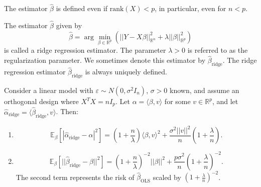 \documentclass[open=any, 11pt,paper=A4]{scrreprt}
\begin{document}
\begin{remark}
The estimator $\hat{\beta}$ is defined even if $\text{rank}(X) < p$, in particular, even for $n < p$.
\end{remark}

\begin{definition}
The estimator $\hat{\beta}$ given by
\[
\hat{\beta} = \arg\min_{\beta \in \mathbb{R}^p} \left( ||Y - X\beta||^2_{\mathbb{R}^n} + \lambda ||\beta||_{\mathbb{R}^p}^2 \right)
\]
is called a ridge regression estimator. The parameter $\lambda > 0$ is referred to as the regularization parameter. We sometimes denote this estimator by $\hat{\beta}_{\text{ridge}}$. The ridge regression estimator $\hat{\beta}_{\text{ridge}}$ is always uniquely defined.
\end{definition}

\begin{proposition}
Consider a linear model with $\varepsilon \sim N(0, \sigma^2 I_n)$, $\sigma > 0$ known, and assume an orthogonal design where $X^T X = nI_p$. Let $\alpha = \langle \beta, v \rangle$ for some $v \in \mathbb{R}^p$, and let $\hat{\alpha}_{\text{ridge}} = \langle \hat{\beta}_{\text{ridge}}, v \rangle$. Then:
\begin{enumerate}
    \item 
    \[
    \mathbb{E}_\beta \left[ |\hat{\alpha}_{\text{ridge}} - \alpha|^2 \right] = \left(1 + \frac{n}{\lambda}\right) \langle \beta, v \rangle^2 + \frac{\sigma^2 ||v||^2}{n} \left(1 + \frac{\lambda}{n}\right).
    \]
    \item 
    \[
    \mathbb{E}_\beta \left[ ||\hat{\beta}_{\text{ridge}} - \beta||^2 \right] = \left(1 + \frac{n}{\lambda}\right)^{-2} ||\beta||^2 + \frac{p \sigma^2}{n} \left(1 + \frac{\lambda}{n}\right)^{-2}.
    \]
    The second term represents the risk of $\hat{\beta}_{\text{OLS}}$ scaled by $\left(1 + \frac{\lambda}{n}\right)^{-2}$.
\end{enumerate}
\end{proposition}



















\iffalse


\appendix
\end{document}
